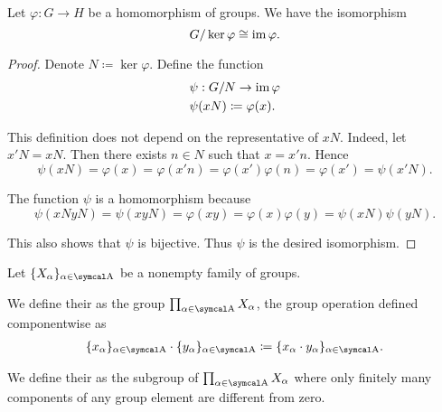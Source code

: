 \begin{theorem}\label{thm:homomorphism_theorem_for_groups}
  Let \( \varphi: G \to H \) be a homomorphism of groups. We have the isomorphism
  \begin{equation*}
    G / \ker \varphi \cong \operatorname{im} \varphi.
  \end{equation*}
\end{theorem}
\begin{proof}
  Denote \( N \coloneqq \ker \varphi \). Define the function
  \begin{align*}
    &\psi: G / N \to \operatorname{im} \varphi \\
    &\psi(xN) \coloneqq \varphi(x).
  \end{align*}

  This definition does not depend on the representative of \( xN \). Indeed, let \( x'N = xN \). Then there exists \( n \in N \) such that \( x = x' n \). Hence
  \begin{equation*}
    \psi(xN) = \varphi(x) = \varphi(x' n) = \varphi(x') \varphi(n) = \varphi(x') = \psi(x'N).
  \end{equation*}

  The function \( \psi \) is a homomorphism because
  \begin{equation*}
    \psi(xN yN) = \psi(xyN) = \varphi(xy) = \varphi(x) \varphi(y) = \psi(xN) \psi(yN).
  \end{equation*}

  This also shows that \( \psi \) is bijective. Thus \( \psi \) is the desired isomorphism.
\end{proof}

\begin{definition}\label{def:group_direct_product}
  Let \( \{ X_\al \}_{\al \in \CA} \) be a nonempty family of groups.

  We define their  as the group \( \prod_{\al \in \CA} X_\al \), the group operation defined componentwise as
  \begin{align*}
    \{ x_\al \}_{\al \in \CA} \cdot \{ y_\al \}_{\al \in \CA}
    \coloneqq
    \{ x_\al \cdot y_\al \}_{\al \in \CA}.
  \end{align*}

  We define their  as the subgroup of \( \prod_{\al \in \CA} X_\al \) where only finitely many components of any group element are different from zero.
\end{definition}

